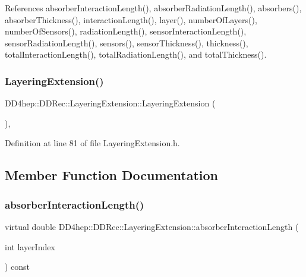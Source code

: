 References absorber\+Interaction\+Length(), absorber\+Radiation\+Length(), absorbers(), absorber\+Thickness(), interaction\+Length(), layer(), number\+Of\+Layers(), number\+Of\+Sensors(), radiation\+Length(), sensor\+Interaction\+Length(), sensor\+Radiation\+Length(), sensors(), sensor\+Thickness(), thickness(), total\+Interaction\+Length(), total\+Radiation\+Length(), and total\+Thickness().

\hypertarget{class_d_d4hep_1_1_d_d_rec_1_1_layering_extension_abea54214401d949b2b3313e0c1d448af}{}\label{class_d_d4hep_1_1_d_d_rec_1_1_layering_extension_abea54214401d949b2b3313e0c1d448af} 
\subsubsection{\texorpdfstring{Layering\+Extension()}{LayeringExtension()}}
{\footnotesize\ttfamily D\+D4hep\+::\+D\+D\+Rec\+::\+Layering\+Extension\+::\+Layering\+Extension (\begin{DoxyParamCaption}{ }\end{DoxyParamCaption})\hspace{0.3cm}{\ttfamily [inline]}, {\ttfamily [protected]}}



Definition at line 81 of file Layering\+Extension.\+h.



\subsection{Member Function Documentation}
\hypertarget{class_d_d4hep_1_1_d_d_rec_1_1_layering_extension_af18b1293c0631bd55798e7c73eddeb6b}{}\label{class_d_d4hep_1_1_d_d_rec_1_1_layering_extension_af18b1293c0631bd55798e7c73eddeb6b} 
\subsubsection{\texorpdfstring{absorber\+Interaction\+Length()}{absorberInteractionLength()}}
{\footnotesize\ttfamily virtual double D\+D4hep\+::\+D\+D\+Rec\+::\+Layering\+Extension\+::absorber\+Interaction\+Length (\begin{DoxyParamCaption}\item[{int}]{layer\+Index }\end{DoxyParamCaption}) const\hspace{0.3cm}{\ttfamily [pure virtual]}}



